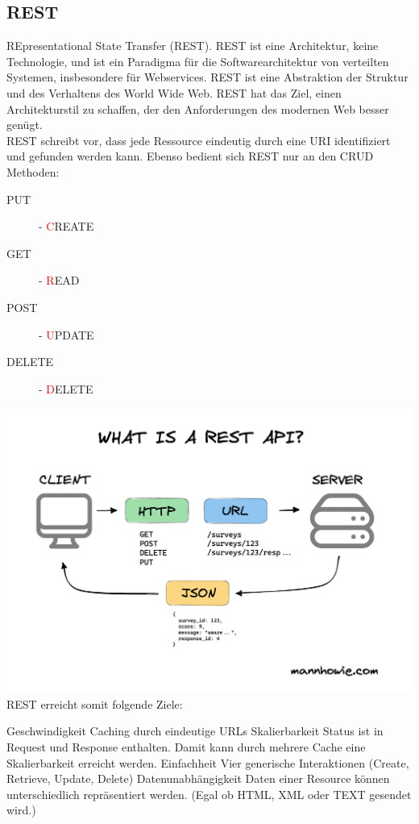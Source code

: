 \documentclass[12pt,a4paper]{article}
\begin{document}
\subsection{REST}
REpresentational State Transfer (REST). REST ist eine Architektur, keine Technologie, und ist ein Paradigma für die Softwarearchitektur von verteilten Systemen, insbesondere für Webservices. REST ist eine Abstraktion der Struktur und des Verhaltens des World Wide Web. REST hat das Ziel, einen Architekturstil zu schaffen, der den Anforderungen des modernen Web besser genügt.\\
REST schreibt vor, dass jede Ressource eindeutig durch eine URI identifiziert und gefunden werden kann. Ebenso bedient sich REST nur an den CRUD Methoden:\\
\begin{description}
	\item[PUT] - \textcolor{red}{C}REATE
	\item[GET] - \textcolor{red}{R}EAD
	\item[POST] - \textcolor{red}{U}PDATE
	\item[DELETE] - \textcolor{red}{D}ELETE
\end{description}
\includegraphics[width=\textwidth]{Bilder/rest.png}
REST erreicht somit folgende Ziele:\\
\begin{outline}
	\1 Geschwindigkeit 
		\2 Caching durch eindeutige URLs 
	\1 Skalierbarkeit
		\2 Status ist in Request und Response enthalten. Damit kann durch mehrere Cache eine Skalierbarkeit erreicht werden.
	\1 Einfachheit
	 	\2 Vier generische Interaktionen (Create, Retrieve, Update, Delete)
	\1 Datenunabhängigkeit
		\2 Daten einer Resource können unterschiedlich repräsentiert werden. (Egal ob HTML, XML oder TEXT gesendet wird.)
\end{outline}
\end{document}

